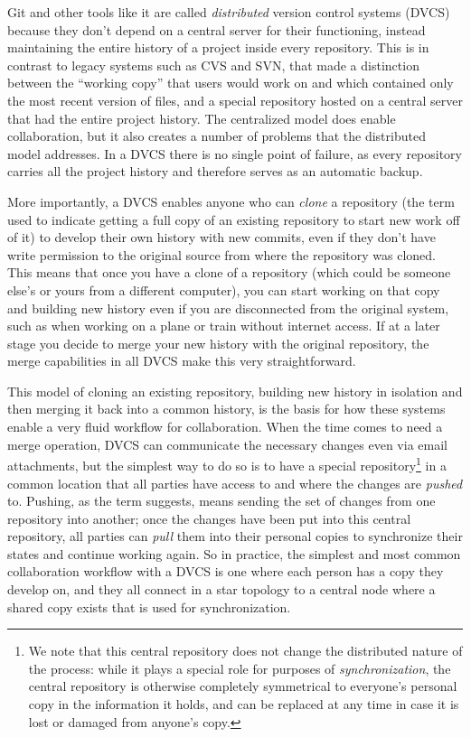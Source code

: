 \documentclass[ChapterTOCs,krantz2]{krantz} %
\theoremstyle{definition}
\begin{document}
Git and other tools like it are called \emph{distributed} version control
systems (DVCS) because they don't depend on a central server for their functioning,
instead maintaining the entire history of a project inside every repository.
This is in contrast to legacy systems such as CVS and SVN, that made a
distinction between the ``working copy'' that users would work on and which
contained only the most recent version of files, and a special repository
hosted on a central server that had the entire project history.  The
centralized model does enable collaboration, but it also creates a number of
problems that the distributed model addresses.  In a DVCS there is no single
point of failure, as every repository carries all the project history and
therefore serves as an automatic backup.

More importantly, a DVCS enables anyone who can \emph{clone} a repository (the
term used to indicate getting a full copy of an existing repository to start
new work off of it) to develop their own history with new commits, even if they
don't have write permission to the original source from where the repository
was cloned.  This means that once you have a clone of a repository (which could
be someone else's or yours from a different computer), you can start working on
that copy and building new history even if you are disconnected from the
original system, such as when working on a plane or train without internet
access.  If at a later stage you decide to merge your new history with the
original repository, the merge capabilities in all DVCS make this very
straightforward.

This model of cloning an existing repository, building new history in isolation
and then merging it back into a common history, is the basis for how these
systems enable a very fluid workflow for collaboration.  When the time comes to
need a merge operation, DVCS can communicate the necessary changes even
via email attachments, but the simplest way to do so is to have a special
repository\footnote{We note that this central repository does not change the
  distributed nature of the process: while it plays a special role for purposes
  of \emph{synchronization}, the central repository is otherwise completely
  symmetrical to everyone's personal copy in the information it holds, and can
  be replaced at any time in case it is lost or damaged from anyone's copy.} in
a common location that all parties have access to and where the changes are
\emph{pushed} to.  Pushing, as the term suggests, means sending the set of
changes from one repository into another; once the changes have been put into
this central repository, all parties can \emph{pull} them into their personal
copies to synchronize their states and continue working again.  So in practice,
the simplest and most common collaboration workflow with a DVCS is one where
each person has a copy they develop on, and they all connect in a star topology
to a central node where a shared copy exists that is used for synchronization.
\end{document}
